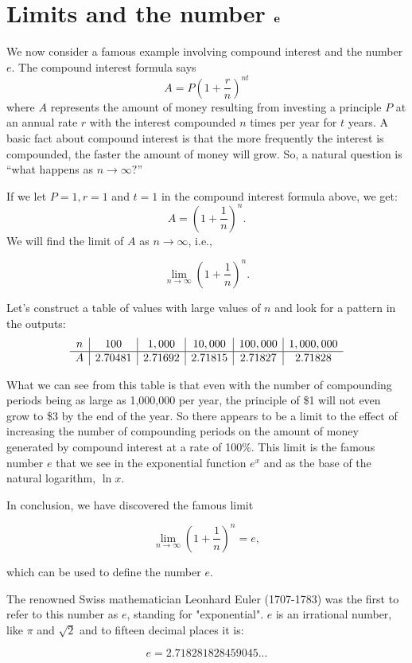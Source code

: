 \documentclass[handout]{ximera}
\begin{document}
\section{Limits and the number ${\bf e}$}


We now consider a famous example involving compound interest and the number $e$.
The compound interest formula says 
\[ A = P\left(1+\frac{r}{n}\right)^{nt} \]
where $A$ represents the amount of money resulting from investing a principle $P$ at an annual rate $r$ with 
the interest compounded $n$ times per year for $t$ years.  A basic fact about compound interest is that the more frequently 
the interest is compounded, the faster the amount of money will grow. 
So, a natural question is ``what happens as $n \to \infty?$''



\begin{example}[example 7]
If we let $P=1, r= 1$ and $t=1$ in the compound interest formula above, we get:
\[
A = \left(1 + \frac{1}{n}\right)^n.
\]
 We will find the limit of $A$ as $n \to \infty$, i.e., 

\[
\lim_{n \to \infty} \left(1+\frac{1}{n}\right)^n.
\]

Let's construct a table of values with large values of $n$ and look for a pattern in the outputs:
\[
\begin{array}{ c | c | c | c | c|c}
  n & 100 & 1,000 & 10,000 & 100,000 & 1,000,000\\ 
	\hline
	A & 2.70481 & 2.71692 & 2.71815 & 2.71827 & 2.71828
	\end{array}
\] 

What we can see from this table is that even with the number of compounding periods being as large as 1,000,000 per year, 
the principle of \$1 will not even grow to \$3 by the end of the year.  So there appears to be a limit to the effect of increasing the 
number of compounding periods on the amount of money generated by compound interest at a rate of 100\%. 
This limit is the famous number $e$ that we see in the exponential function $e^x$ and as the base of the natural logarithm, $\ln x$.

In conclusion, we have discovered the famous limit

\[\lim_{n \to \infty} \left(1+\frac{1}{n}\right)^n = e,\]

which can be used to define the number $e$.

The renowned Swiss mathematician Leonhard Euler (1707-1783) was the first to refer to this number as $e$,
standing for "exponential".  $e$ is an irrational number, like $\pi$ and $\sqrt 2$ and to fifteen decimal places it is:

\[ e = 2.718281828459045... \]

\end{example}
\end{document}
